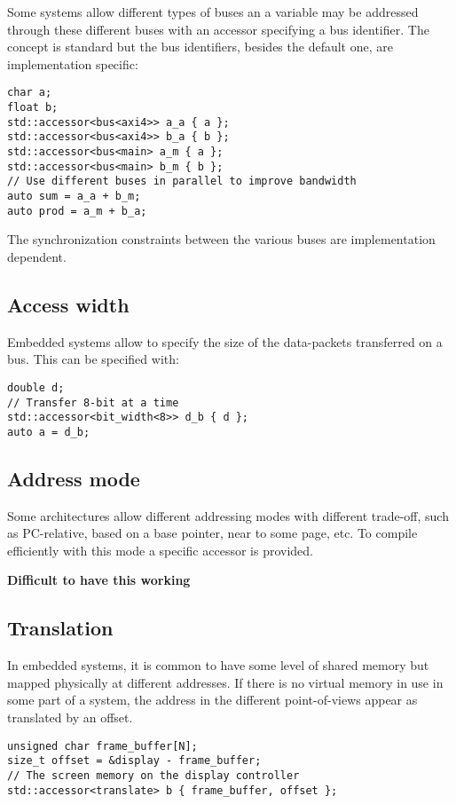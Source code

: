 \documentclass[a4paper]{article}
\begin{document}
Some systems allow different types of buses an a variable may be
addressed through these different buses with an accessor specifying a
bus identifier. The concept is standard but the bus identifiers,
besides the default one, are implementation specific:
\begin{lstlisting}
char a;
float b;
std::accessor<bus<axi4>> a_a { a };
std::accessor<bus<axi4>> b_a { b };
std::accessor<bus<main> a_m { a };
std::accessor<bus<main> b_m { b };
// Use different buses in parallel to improve bandwidth
auto sum = a_a + b_m;
auto prod = a_m + b_a;
\end{lstlisting}

The synchronization constraints between the various buses are
implementation dependent.


\subsection{Access width}
\label{sec:access-width}

Embedded systems allow to specify the size of the data-packets
transferred on a bus. This can be specified with:
\begin{lstlisting}
double d;
// Transfer 8-bit at a time
std::accessor<bit_width<8>> d_b { d };
auto a = d_b;
\end{lstlisting}


\subsection{Address mode}
\label{sec:address-mode}

Some architectures allow different addressing modes with different
trade-off, such as PC-relative, based on a base pointer, near to some
page, etc. To compile efficiently with this mode a specific accessor
is provided.

\textbf{Difficult to have this working}


\subsection{Translation}
\label{sec:translation}

In embedded systems, it is common to have some level of shared memory
but mapped physically at different addresses. If there is no virtual
memory in use in some part of a system, the address in the different
point-of-views appear as translated by an offset.
\begin{lstlisting}
unsigned char frame_buffer[N];
size_t offset = &display - frame_buffer;
// The screen memory on the display controller
std::accessor<translate> b { frame_buffer, offset };
\end{lstlisting}
\end{document}
